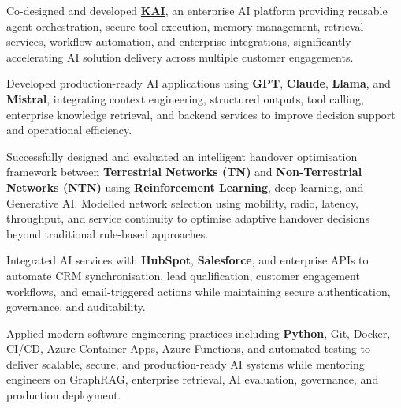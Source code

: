 \begin{zitemize}
\item Co-designed and developed \href{https://platform.awtg.ai/login}{\textbf{KAI}}, an enterprise AI platform providing reusable agent orchestration, secure tool execution, memory management, retrieval services, workflow automation, and enterprise integrations, significantly accelerating AI solution delivery across multiple customer engagements.

\item Developed production-ready AI applications using \textbf{GPT}, \textbf{Claude}, \textbf{Llama}, and \textbf{Mistral}, integrating context engineering, structured outputs, tool calling, enterprise knowledge retrieval, and backend services to improve decision support and operational efficiency.

\item Successfully designed and evaluated an intelligent handover optimisation framework between \textbf{Terrestrial Networks (TN)} and \textbf{Non-Terrestrial Networks (NTN)} using \textbf{Reinforcement Learning}, deep learning, and Generative AI. Modelled network selection using mobility, radio, latency, throughput, and service continuity to optimise adaptive handover decisions beyond traditional rule-based approaches.

\item Integrated AI services with \textbf{HubSpot}, \textbf{Salesforce}, and enterprise APIs to automate CRM synchronisation, lead qualification, customer engagement workflows, and email-triggered actions while maintaining secure authentication, governance, and auditability.

\item Applied modern software engineering practices including \textbf{Python}, Git, Docker, CI/CD, Azure Container Apps, Azure Functions, and automated testing to deliver scalable, secure, and production-ready AI systems while mentoring engineers on GraphRAG, enterprise retrieval, AI evaluation, governance, and production deployment.

\end{zitemize}



